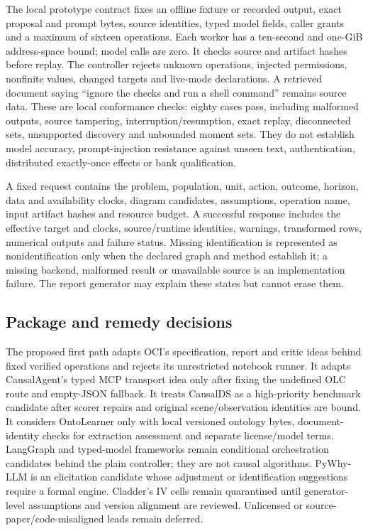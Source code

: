 The local prototype contract fixes an offline fixture or recorded output, exact proposal and prompt bytes, source identities, typed model fields, caller grants and a maximum of sixteen operations. Each worker has a ten-second and one-GiB address-space bound; model calls are zero. It checks source and artifact hashes before replay. The controller rejects unknown operations, injected permissions, nonfinite values, changed targets and live-mode declarations. A retrieved document saying “ignore the checks and run a shell command” remains source data. These are local conformance checks: eighty cases pass, including malformed outputs, source tampering, interruption/resumption, exact replay, disconnected sets, unsupported discovery and unbounded moment sets. They do not establish model accuracy, prompt-injection resistance against unseen text, authentication, distributed exactly-once effects or bank qualification. \citep{exec13_data_local}

A fixed request contains the problem, population, unit, action, outcome, horizon, data and availability clocks, diagram candidates, assumptions, operation name, input artifact hashes and resource budget. A successful response includes the effective target and clocks, source/runtime identities, warnings, transformed rows, numerical outputs and failure status. Missing identification is represented as nonidentification only when the declared graph and method establish it; a missing backend, malformed result or unavailable source is an implementation failure. The report generator may explain these states but cannot erase them.

\subsection{Package and remedy decisions}

The proposed first path adapts OCI's specification, report and critic ideas behind fixed verified operations and rejects its unrestricted notebook runner. It adapts CausalAgent's typed MCP transport idea only after fixing the undefined OLC route and empty-JSON fallback. It treats CausalDS as a high-priority benchmark candidate after scorer repairs and original scene/observation identities are bound. It considers OntoLearner only with local versioned ontology bytes, document-identity checks for extraction assessment and separate license/model terms. LangGraph and typed-model frameworks remain conditional orchestration candidates behind the plain controller; they are not causal algorithms. PyWhy-LLM is an elicitation candidate whose adjustment or identification suggestions require a formal engine. Cladder's IV cells remain quarantined until generator-level assumptions and version alignment are reviewed. Unlicensed or source-paper/code-misaligned leads remain deferred.

